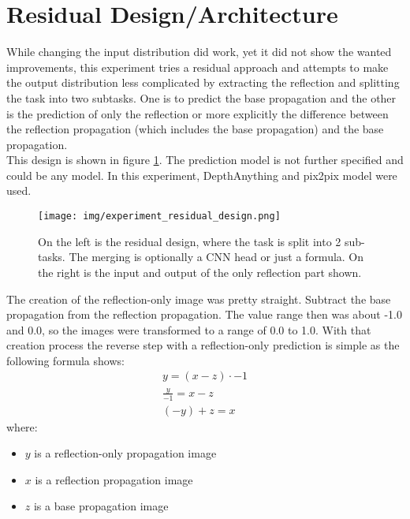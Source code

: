 	\clearpage
		
	\section{Residual Design/Architecture}
	\label{sec:experiments-residual_architecture}
		While changing the input distribution did work, yet it did not show the wanted improvements, this experiment tries a residual approach and attempts to make the output distribution less complicated by extracting the reflection and splitting the task into two subtasks. One is to predict the base propagation and the other is the prediction of only the reflection or more explicitly the difference between the reflection propagation (which includes the base propagation) and the base propagation. \\This design is shown in figure \ref{fig:experiment_residual_design}. 
		The prediction model is not further specified and could be any model. In this experiment, DepthAnything and pix2pix model were used.
		\begin{figure}[H]
			\centering
			\texttt{[image: img/experiment\_residual\_design.png]}
			\caption[On the left is the residual design, where the task is split into 2 sub-tasks. The merging is optionally a CNN head or just a formula. On the right is the input and output of the only reflection part shown.]{On the left is the residual design, where the task is split into 2 sub-tasks. The merging is optionally a CNN head or just a formula. On the right is the input and output of the only reflection part shown.}
			\label{fig:experiment_residual_design}
		\end{figure}
		\FloatBarrier
		The creation of the reflection-only image was pretty straight. Subtract the base propagation from the reflection propagation. The value range then was about -1.0 and 0.0, so the images were transformed to a range of 0.0 to 1.0. With that creation process the reverse step with a reflection-only prediction is simple as the following formula shows:
		\begin{align}  %
			\label{reflection-only-formula}
			y = (x - z) \cdot -1 \\
			\frac{y}{-1} = x - z \\
			\left(-y \right) + z = x
		\end{align}
		\noindent where:
		\begin{itemize}[itemsep=1mm, parsep=0pt]
			\item $y$ is a reflection-only propagation image
			\item $x$ is a reflection propagation image
			\item $z$ is a base propagation image
		\end{itemize}
		
